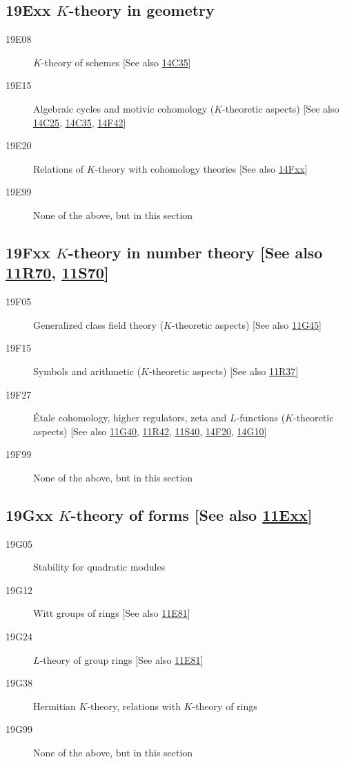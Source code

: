 \documentclass[letterpaper]{article}
\begin{document}
\subsection*{19Exx  $K$-theory in geometry }\label{19Exx}
\begin{description}  
\item [19E08]\label{19E08} $K$-theory of schemes [See also \hyperref[14C35]{14C35}]
\item [19E15]\label{19E15} Algebraic cycles and motivic cohomology ($K$-theoretic aspects) [See also \hyperref[14C25]{14C25}, \hyperref[14C35]{14C35}, \hyperref[14F42]{14F42}]
\item [19E20]\label{19E20} Relations of $K$-theory with cohomology theories [See also \hyperref[14Fxx]{14Fxx}]
\item [19E99]\label{19E99} None of the above, but in this section
\end{description}
\subsection*{19Fxx  $K$-theory in number theory [See also \hyperref[11R70]{11R70}, \hyperref[11S70]{11S70}] }\label{19Fxx}
\begin{description}  
\item [19F05]\label{19F05} Generalized class field theory ($K$-theoretic aspects) [See also \hyperref[11G45]{11G45}]
\item [19F15]\label{19F15} Symbols and arithmetic ($K$-theoretic aspects) [See also \hyperref[11R37]{11R37}]
\item [19F27]\label{19F27} \'{E}tale cohomology, higher regulators, zeta and $L$-functions ($K$-theoretic aspects) [See also \hyperref[11G40]{11G40}, \hyperref[11R42]{11R42}, \hyperref[11S40]{11S40}, \hyperref[14F20]{14F20}, \hyperref[14G10]{14G10}]
\item [19F99]\label{19F99} None of the above, but in this section
\end{description}
\subsection*{19Gxx  $K$-theory of forms [See also \hyperref[11Exx]{11Exx}] }\label{19Gxx}
\begin{description}  
\item [19G05]\label{19G05} Stability for quadratic modules
\item [19G12]\label{19G12} Witt groups of rings [See also \hyperref[11E81]{11E81}]
\item [19G24]\label{19G24} $L$-theory of group rings [See also \hyperref[11E81]{11E81}]
\item [19G38]\label{19G38} Hermitian $K$-theory, relations with $K$-theory of rings
\item [19G99]\label{19G99} None of the above, but in this section
\end{description}
\end{document}
